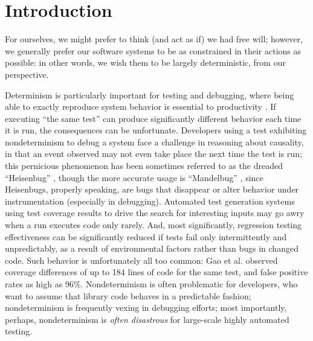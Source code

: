\section{Introduction}

For ourselves, we might prefer to think (and act as if) we had free
will; however, we generally prefer our software systems to be as
constrained in their actions as possible:  in other words, we wish
them to be largely deterministic, from our perspective.

Determinism is particularly important for testing and debugging, where
being able to exactly reproduce system behavior is essential to
productivity \cite{Firesmith}.  If executing ``the same test'' can produce
significantly different behavior each time it is run, the consequences
can be unfortunate.  Developers using a test exhibiting nondeterminism
to debug a system
face a challenge in reasoning about causality, in that an event
observed may not even take place the next time the test is run; this
pernicious phenomenon has been sometimes referred to as the dreaded
``Heisenbug'' \cite{Heisenbug}, though the more accurate usage is
``Mandelbug'' \cite{GrottkeBugs,FaultTriggers}, since Heisenbugs, properly speaking, are bugs that disappear or
alter behavior under instrumentation (especially in debugging).
Automated test generation systems using test coverage results to drive
the search for interesting inputs may go awry when a run executes
code only rarely.  And, most significantly, regression testing
effectiveness can be significantly reduced if tests fail only
intermittently and unpredictably, as a result of environmental
factors rather than bugs in changed code.  Such behavior is
unfortunately all too common:  Gao et
al. \cite{Gao:2015:MSU:2818754.2818764} observed coverage differences
of up to 184 lines of code for the same test, and false positive rates
as high as 96\%.  Nondeterminism is often problematic for
developers, who want to  assume that library code behaves in a  predictable fashion; nondeterminism is
frequently vexing in debugging efforts; most importantly, perhaps, nondeterminism is \emph{often disastrous} for large-scale highly
automated testing.



